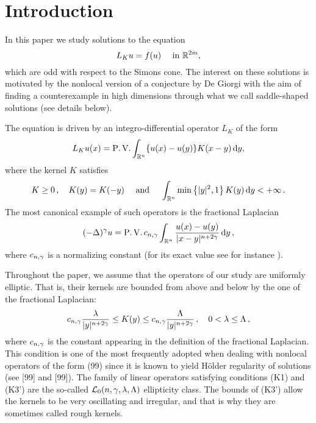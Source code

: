 \section{Introduction}
\label{Sec:Introduction}


In this paper we study solutions to the equation
\begin{equation}
\label{Eq:NonlocalAllenCahn}
L_K u = f(u) \quad \textrm{ in } \mathbb{R}^{2m},
\end{equation}
which are odd with respect to the Simons cone. The interest on these solutions is motivated by the nonlocal version of a conjecture by De Giorgi with the aim of finding a counterexample in high dimensions through what we call saddle-shaped solutions (see details below).

The equation is driven by an integro-differential operator $L_K$ of the form
\begin{equation}
\label{Eq:DefOfLu}
L_Ku(x) = \operatorname{P.V.} \int_{\mathbb{R}^n} \{u(x) - u(y)\} K(x-y)\,\mathrm{d} y,
\end{equation}
where the kernel $K$ satisfies
\begin{equation}
\label{Eq:Symmetry&IntegrabilityOfK}
K\geq 0\,, \quad K(y) = K(-y) \quad \textrm{ and } \quad \int_{\mathbb{R}^n} \min \left\{ |y|^2, 1 \right\} K(y) \,\mathrm{d} y < + \infty\,.
\end{equation}
The most canonical example of such operators is the fractional Laplacian
$$
(-\Delta)^\gamma u = \operatorname{P.V.} c_{n, \gamma}\int_{\mathbb{R}^n} \dfrac{u(x) - u(y)}{|x-y|^{n + 2\gamma}}\,\mathrm{d} y\,,
$$
where $c_{n, \gamma}$ is a normalizing constant (for its exact value see for instance \cite{HitchhikerGuide}).

Throughout the paper, we assume that the operators of our study are uniformly elliptic. That is, their kernels are bounded from above and below by the one of the fractional Laplacian:
\begin{equation}
\label{Eq:Ellipticity}
c_{n,\gamma}\dfrac{\lambda}{|y|^{n+2\gamma}} \leq K(y) \leq c_{n,\gamma}\dfrac{\Lambda}{|y|^{n+2\gamma}}\,, \quad 0< \lambda \leq \Lambda \,,
\end{equation}
where $c_{n,\gamma}$ is the constant appearing in the definition of the fractional Laplacian. This condition is one of the most frequently adopted when dealing with nonlocal operators of the form (99) since it is known to yield Hölder regularity of solutions (see [99] and [99]). The family of linear operators satisfying conditions (K1) and (K3') are the so-called $\mathcal{L}_0(n,\gamma,\lambda, \Lambda)$ ellipticity class.
The bounds of (K3') allow the kernels to be very oscillating and irregular, and that is why they are sometimes called rough kernels.

